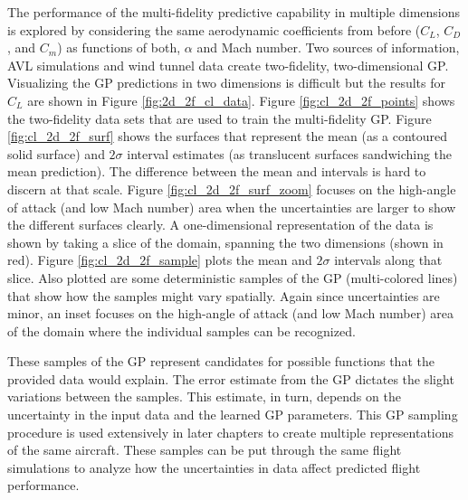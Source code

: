 The performance of the multi-fidelity predictive capability in multiple dimensions is explored by considering the same aerodynamic coefficients from before ($C_L$, $C_D$, and $C_m$) as functions of both, $\alpha$ and Mach number.
Two sources of information, AVL simulations and wind tunnel data create two-fidelity, two-dimensional GP.
Visualizing the GP predictions in two dimensions is difficult but the results for $C_L$ are shown in Figure \ref{fig:2d_2f_cl_data}.
Figure \ref{fig:cl_2d_2f_points} shows the two-fidelity data sets that are used to train the multi-fidelity GP.
Figure \ref{fig:cl_2d_2f_surf} shows the surfaces that represent the mean (as a contoured solid surface) and $2\sigma$ interval estimates (as translucent surfaces sandwiching the mean prediction).
The difference between the mean and intervals is hard to discern at that scale.
Figure \ref{fig:cl_2d_2f_surf_zoom} focuses on the high-angle of attack (and low Mach number) area when the uncertainties are larger to show the different surfaces clearly.
A one-dimensional representation of the data is shown by taking a slice of the domain, spanning the two dimensions (shown in red).
Figure \ref{fig:cl_2d_2f_sample} plots the mean and $2\sigma$ intervals along that slice.
Also plotted are some deterministic samples of the GP (multi-colored lines) that show how the samples might vary spatially.
Again since uncertainties are minor, an inset focuses on the high-angle of attack (and low Mach number) area of the domain where the individual samples can be recognized.

These samples of the GP represent candidates for possible functions that the provided data would explain. 
The error estimate from the GP dictates the slight variations between the samples.
This estimate, in turn, depends on the uncertainty in the input data and the learned GP parameters. 
This GP sampling procedure is used extensively in later chapters to create multiple representations of the same aircraft. 
These samples can be put through the same flight simulations to analyze how the uncertainties in data affect predicted flight performance.

